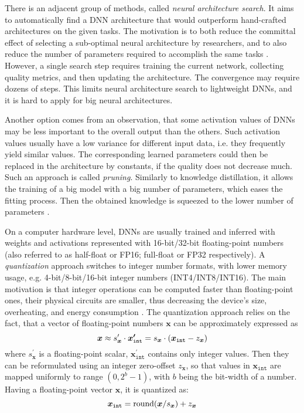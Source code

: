 There is an adjacent group of methods, called \textit{neural architecture search}. It aims to automatically find a DNN architecture that would outperform hand-crafted architectures on the given tasks. The motivation is to both reduce the committal effect of selecting a sub-optimal neural architecture by researchers, and to also reduce the number of parameters required to accomplish the same tasks \cite{survey:neural-arch-search19, dnn:eff-neural-arch-search18}. However, a single search step requires training the current network, collecting quality metrics, and then updating the architecture. The convergence may require dozens of steps. This limits neural architecture search to lightweight DNNs, and it is hard to apply for big neural architectures.

Another option comes from an observation, that some activation values of DNNs may be less important to the overall output than the others. Such activation values usually have a low variance for different input data, i.e. they frequently yield similar values. The corresponding learned parameters could then be replaced in the architecture by constants, if the quality does not decrease much. Such an approach is called \textit{pruning}. Similarly to knowledge distillation, it allows the training of a big model with a big number of parameters, which eases the fitting process. Then the obtained knowledge is squeezed to the lower number of parameters  \cite{method:pruning16, survey:pruning20, speed:prunning-gan21}.

On a computer hardware level, DNNs are usually trained and inferred with weights and activations represented with 16-bit/32-bit floating-point numbers (also referred to as half-float or FP16; full-float or FP32 respectively). A \textit{quantization} approach switches to integer number formats, with lower memory usage, e.g. 4-bit/8-bit/16-bit integer numbers (INT4/INT8/INT16). The main motivation is that integer operations can be computed faster than floating-point ones, their physical circuits are smaller, thus decreasing the device's size, overheating, and energy consumption \cite{aux:fp-int-speed10}. The quantization approach relies on the fact, that a vector of floating-point numbers $\bm{x}$ can be approximately expressed as 
\begin{equation}
	\setlength\abovedisplayskip{0pt}
	\bm{x} \approx s^\prime_{\bm{x}} \cdot \bm{x^\prime_{\mathtt{int}}} = s_{\bm{x}} \cdot (\bm{x_{\mathtt{int}}} - z_{\bm{x}})
	\setlength\belowdisplayskip{0pt}
\end{equation} where $s^\prime_{\bm{x}}$ is a floating-point scalar, $\bm{x^\prime_{\mathtt{int}}}$ contains only integer values. Then they can be reformulated using an integer zero-offset $z_{\bm{x}}$, so that values in $\bm{x_{\mathtt{int}}}$ are mapped uniformly to range $(0, 2^b-1)$, with $b$ being the bit-width of a number. Having a floating-point vector $\bm{x}$, it is quantized as:  
\begin{equation}
	\setlength\abovedisplayskip{0pt}
	\bm{x_{\mathtt{int}}} = \text{round}(\bm{x}/s_{\bm{x}}) + z_{\bm{x}}
	\setlength\belowdisplayskip{0pt}
	\label{lit:eq:float-to-quantized}
\end{equation}


